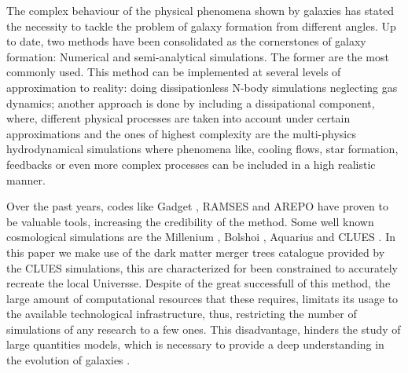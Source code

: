 \documentclass[usenatbib]{mn2e}
\begin{document}
The complex behaviour of the physical phenomena shown by galaxies has
stated the necessity to tackle the problem of galaxy formation from
different angles. Up to date, two methods have been consolidated as
the cornerstones of galaxy formation: Numerical and semi-analytical
simulations.  The former are the most commonly used. This method can
be implemented at several levels of approximation to reality:  doing
dissipationless N-body simulations neglecting gas dynamics; another
approach is done by including a dissipational component, where,
different physical processes are taken into account under certain
approximations and the ones of highest complexity are the
multi-physics hydrodynamical simulations where phenomena like, cooling
flows, star formation, feedbacks or even more complex processes can be
included in a high realistic manner. 

Over the past years, codes like Gadget \citep{2005MNRAS.364.1105S},
RAMSES \citep{2002A&A...385..337T} and AREPO
\citep{2010MNRAS.401..791S} have proven to be valuable tools,
increasing the credibility of  the method. Some well known
cosmological simulations are the Millenium
\citep{2005Natur.435..629S}, Bolshoi \citep{2011ApJ...740..102K},
Aquarius \citep{2008MNRAS.391.1685S} and CLUES
\citep{2010arXiv1005.2687G}. In this paper we make use of the dark
matter merger trees catalogue provided by the CLUES simulations, this
are characterized for been constrained to  accurately recreate the
local Universse. Despite of the great successfull of this method, the
large amount of computational resources that these requires, limitats
its usage to the  available technological infrastructure, thus,
restricting the number of simulations of any research to a few
ones. This disadvantage, hinders the study of large quantities models,
which is necessary to provide a deep understanding in the evolution of
galaxies . 
\end{document}
